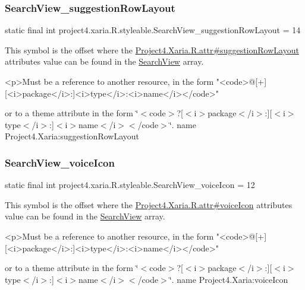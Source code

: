 \subsubsection{\texorpdfstring{Search\+View\+\_\+suggestion\+Row\+Layout}{SearchView\_suggestionRowLayout}}
{\footnotesize\ttfamily static final int project4.\+xaria.\+R.\+styleable.\+Search\+View\+\_\+suggestion\+Row\+Layout = 14\hspace{0.3cm}{\ttfamily [static]}}

This symbol is the offset where the \hyperlink{}{Project4.\+Xaria.\+R.\+attr\#suggestion\+Row\+Layout} attribute\textquotesingle{}s value can be found in the \hyperlink{classproject4_1_1xaria_1_1R_1_1styleable_a6308d960f6e1e05e5316efa4904fedfc}{Search\+View} array.

\begin{DoxyVerb}      <p>Must be a reference to another resource, in the form "<code>@[+][<i>package</i>:]<i>type</i>:<i>name</i></code>"
\end{DoxyVerb}
 or to a theme attribute in the form \char`\"{}$<$code$>$?\mbox{[}$<$i$>$package$<$/i$>$\+:\mbox{]}\mbox{[}$<$i$>$type$<$/i$>$\+:\mbox{]}$<$i$>$name$<$/i$>$$<$/code$>$\char`\"{}.  name Project4.\+Xaria\+:suggestion\+Row\+Layout \mbox{\label{classproject4_1_1xaria_1_1R_1_1styleable_a4e40fdd0fa9bcc88e6f7800e6542d8ce}} 
\subsubsection{\texorpdfstring{Search\+View\+\_\+voice\+Icon}{SearchView\_voiceIcon}}
{\footnotesize\ttfamily static final int project4.\+xaria.\+R.\+styleable.\+Search\+View\+\_\+voice\+Icon = 12\hspace{0.3cm}{\ttfamily [static]}}

This symbol is the offset where the \hyperlink{}{Project4.\+Xaria.\+R.\+attr\#voice\+Icon} attribute\textquotesingle{}s value can be found in the \hyperlink{classproject4_1_1xaria_1_1R_1_1styleable_a6308d960f6e1e05e5316efa4904fedfc}{Search\+View} array.

\begin{DoxyVerb}      <p>Must be a reference to another resource, in the form "<code>@[+][<i>package</i>:]<i>type</i>:<i>name</i></code>"
\end{DoxyVerb}
 or to a theme attribute in the form \char`\"{}$<$code$>$?\mbox{[}$<$i$>$package$<$/i$>$\+:\mbox{]}\mbox{[}$<$i$>$type$<$/i$>$\+:\mbox{]}$<$i$>$name$<$/i$>$$<$/code$>$\char`\"{}.  name Project4.\+Xaria\+:voice\+Icon \mbox{\label{classproject4_1_1xaria_1_1R_1_1styleable_ab79dc56e0952cebd4f7831958f917b48}} 
